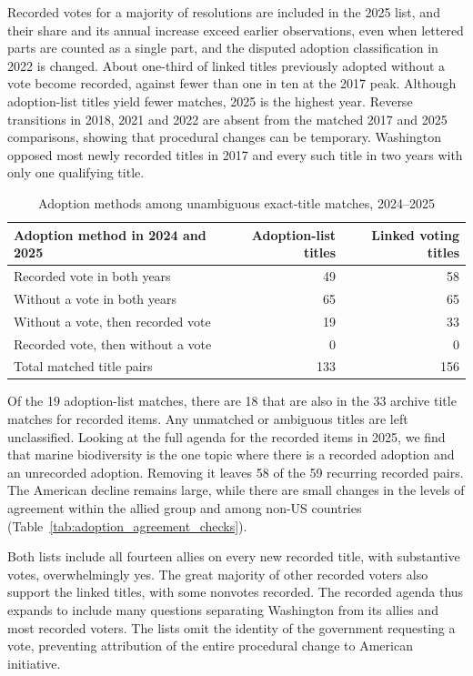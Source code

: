 \documentclass[10pt,authoryear]{elsarticle}
\begin{document}
Recorded votes for a majority of resolutions are included in the 2025 list, and their share and its annual increase exceed earlier observations, even when lettered parts are counted as a single part, and the disputed adoption classification in 2022 is changed. About one-third of linked titles previously adopted without a vote become recorded, against fewer than one in ten at the 2017 peak. Although adoption-list titles yield fewer matches, 2025 is the highest year. Reverse transitions in 2018, 2021 and 2022 are absent from the matched 2017 and 2025 comparisons, showing that procedural changes can be temporary. Washington opposed most newly recorded titles in 2017 and every such title in two years with only one qualifying title.



\begin{table}[htbp]
\centering
\caption{Adoption methods among unambiguous exact-title matches, 2024--2025}
\label{tab:consensus_transitions}
\begin{tabular}{lrr}
\toprule
Adoption method in 2024 and 2025 & Adoption-list titles & Linked voting titles \\
\midrule
Recorded vote in both years & 49 & 58 \\
Without a vote in both years & 65 & 65 \\
Without a vote, then recorded vote & 19 & 33 \\
Recorded vote, then without a vote & 0 & 0 \\
\midrule
Total matched title pairs & 133 & 156 \\
\bottomrule
\end{tabular}
\end{table}

Of the 19 adoption-list matches, there are 18 that are also in the 33 archive title matches for recorded items. Any unmatched or ambiguous titles are left unclassified. Looking at the full agenda for the recorded items in 2025, we find that marine biodiversity is the one topic where there is a recorded adoption and an unrecorded adoption. Removing it leaves 58 of the 59 recurring recorded pairs. The American decline remains large, while there are small changes in the levels of agreement within the allied group and among non-US countries (Table~\ref{tab:adoption_agreement_checks}).



Both lists include all fourteen allies on every new recorded title, with substantive votes, overwhelmingly yes. The great majority of other recorded voters also support the linked titles, with some nonvotes recorded. The recorded agenda thus expands to include many questions separating Washington from its allies and most recorded voters. The lists omit the identity of the government requesting a vote, preventing attribution of the entire procedural change to American initiative.
\end{document}
